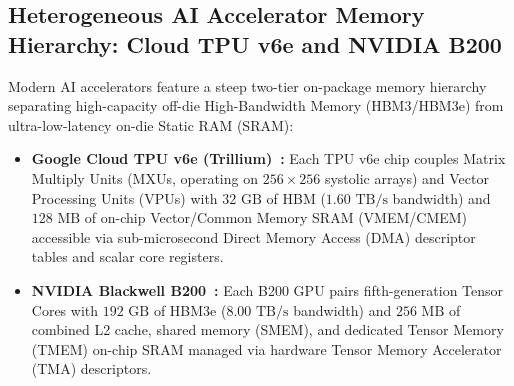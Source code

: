 \documentclass[10pt,conference]{IEEEtran}
\begin{document}
\subsection{Heterogeneous AI Accelerator Memory Hierarchy: Cloud TPU v6e and NVIDIA B200}
Modern AI accelerators feature a steep two-tier on-package memory hierarchy separating high-capacity off-die High-Bandwidth Memory (HBM3/HBM3e) from ultra-low-latency on-die Static RAM (SRAM):
\begin{itemize}
    \item \textbf{Google Cloud TPU v6e (Trillium)~\cite{google2024trillium}:} Each TPU v6e chip couples Matrix Multiply Units (MXUs, operating on $256 \times 256$ systolic arrays) and Vector Processing Units (VPUs) with $32\text{ GB}$ of HBM ($1.60\text{ TB/s}$ bandwidth) and $128\text{ MB}$ of on-chip Vector/Common Memory SRAM (VMEM/CMEM) accessible via sub-microsecond Direct Memory Access (DMA) descriptor tables and scalar core registers.
    \item \textbf{NVIDIA Blackwell B200~\cite{nvidia2024blackwell}:} Each B200 GPU pairs fifth-generation Tensor Cores with $192\text{ GB}$ of HBM3e ($8.00\text{ TB/s}$ bandwidth) and $256\text{ MB}$ of combined L2 cache, shared memory (SMEM), and dedicated Tensor Memory (TMEM) on-chip SRAM managed via hardware Tensor Memory Accelerator (TMA) descriptors.
\end{itemize}

\begin{table}[t]
\centering
\footnotesize
\renewcommand{\arraystretch}{1.08}
\caption{Hardware Microarchitectural Parameters of Google Cloud TPU v6e (Trillium) and NVIDIA Blackwell B200 Used by Agent-Synapse Stage 3}
\label{tab:hw_specs}
\end{table}
\end{document}
